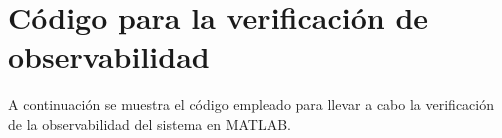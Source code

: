 \chapter{Código para la verificación de observabilidad}
\label{app:implemObservabilidad}

A continuación se muestra el código empleado para llevar a cabo la verificación de la observabilidad del sistema en MATLAB. \\ \par 


